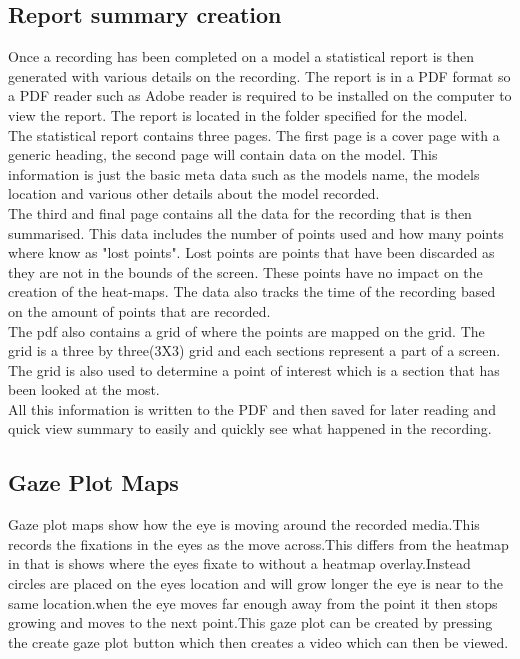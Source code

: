 \subsection{Report summary creation}
Once a recording has been completed on a model a statistical report is then generated with various details on the recording. The report is in a PDF format so a PDF reader such as Adobe reader is required to be installed on the computer to view the report. The report is located in the folder specified for the model.\\
The statistical report contains three pages. The first page is a cover page with a generic heading, the second page will contain data on the model. This information is just the basic meta data such as the models name, the models location and various other details about the model recorded.\\
The third and final page contains all the data for the recording that is then summarised. This data includes the number of points used and how many points where know as "lost points". Lost points are points that have been discarded as they are not in the bounds of the screen. These points have no impact on the creation of the heat-maps. The data also tracks the time of the recording based on the amount of points that are recorded.\\
The pdf also contains a grid of where the points are mapped on the grid. The grid is a three by three(3X3) grid and each sections represent a part of a screen. The grid is also used to determine a point of interest which is a section that has been looked at the most.\\
All this information is written to the PDF and then saved for later reading and quick view summary to easily and quickly see what happened in the recording. \\
\subsection{Gaze Plot Maps}
Gaze plot maps show how the eye is moving around the recorded media.This records the fixations in the eyes as the move across.This differs from the heatmap in that is shows where the eyes fixate to without a heatmap overlay.Instead circles are placed on the eyes location and will grow longer the eye is near to the same location.when the eye moves far enough away from the point it then stops growing and moves to the next point.This gaze plot can be created by pressing the create gaze plot button which then creates a video which can then be viewed. 

